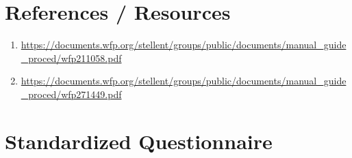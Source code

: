 \documentclass[
]{book}
\begin{document}
\hypertarget{references-resources-1}{%
\section{References / Resources}\label{references-resources-1}}

\begin{enumerate}
\def\labelenumi{\arabic{enumi}.}
\item
  \url{https://documents.wfp.org/stellent/groups/public/documents/manual_guide_proced/wfp211058.pdf}
\item
  \url{https://documents.wfp.org/stellent/groups/public/documents/manual_guide_proced/wfp271449.pdf}
\end{enumerate}

\hypertarget{standardized-questionnaire-1}{%
\section{Standardized Questionnaire}\label{standardized-questionnaire-1}}
\end{document}
